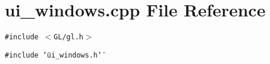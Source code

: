 \section{ui\_\-windows.cpp File Reference}
\label{ui__windows_8cpp}
{\tt \#include $<$GL/gl.h$>$}\par
{\tt \#include \char`\"{}ui\_\-windows.h\char`\"{}}\par
